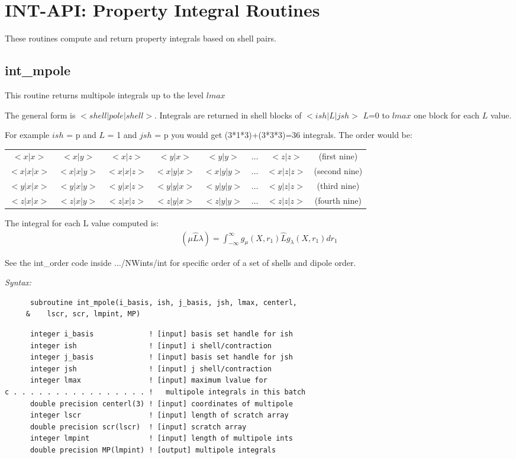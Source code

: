 \section{INT-API: Property Integral Routines} 
These routines compute and return property integrals based on shell pairs. 
% 
 
\subsection{int\_mpole} 
This routine returns multipole integrals up to the level $lmax$ 
 
 The general form is $< shell | pole | shell >$.  
 Integrals are returned in shell blocks of $<ish|L|jsh>$ $L$=0 to $lmax$ 
 one block for each $L$ value.   
 
 For example $ish$ = p and $L$ = 1 and $jsh$ = p you would get  
 (3*1*3)+(3*3*3)=36 integrals. 
 The order would be:\\ 
\begin{tabular}{cccccccc} 
  $<x|x>$   & $<x|y>$   & $<x|z>$   & $<y|x>$   & $<y|y>$  & $\ldots$ & $<z|z>$   & (first nine) \\ 
  $<x|x|x>$ & $<x|x|y>$ & $<x|x|z>$ & $<x|y|x>$ & $<x|y|y>$ & $\ldots$ & $<x|z|z>$ & (second nine)\\ 
  $<y|x|x>$ & $<y|x|y>$ & $<y|x|z>$ & $<y|y|x>$ & $<y|y|y>$ & $\ldots$ & $<y|z|z>$ & (third nine)\\ 
  $<z|x|x>$ & $<z|x|y>$ & $<z|x|z>$ & $<z|y|x>$ & $<z|y|y>$ & $\ldots$ & $<z|z|z>$ & (fourth nine) 
\end{tabular} 
 
The integral for each L value computed is: 
\begin{eqnarray*} 
({\mu}{\hat{L}}{\lambda}) = \int_{-\infty}^{\infty} g_{\mu}(X,r_{1})\hat{L}g_{\lambda}(X,r_{1})dr_{1} 
\end{eqnarray*} 
 
 
 See the int\_order code inside $\ldots$/NWints/int for specific order of a  
 set of shells and dipole order.  
 
{\it Syntax:} 
\begin{verbatim} 
      subroutine int_mpole(i_basis, ish, j_basis, jsh, lmax, centerl, 
     &    lscr, scr, lmpint, MP) 
\end{verbatim} 
\begin{verbatim} 
      integer i_basis             ! [input] basis set handle for ish 
      integer ish                 ! [input] i shell/contraction 
      integer j_basis             ! [input] basis set handle for jsh 
      integer jsh                 ! [input] j shell/contraction 
      integer lmax                ! [input] maximum lvalue for  
c . . . . . . . . . . . . . . . . !   multipole integrals in this batch 
      double precision centerl(3) ! [input] coordinates of multipole 
      integer lscr                ! [input] length of scratch array 
      double precision scr(lscr)  ! [input] scratch array 
      integer lmpint              ! [input] length of multipole ints 
      double precision MP(lmpint) ! [output] multipole integrals 
\end{verbatim} 
